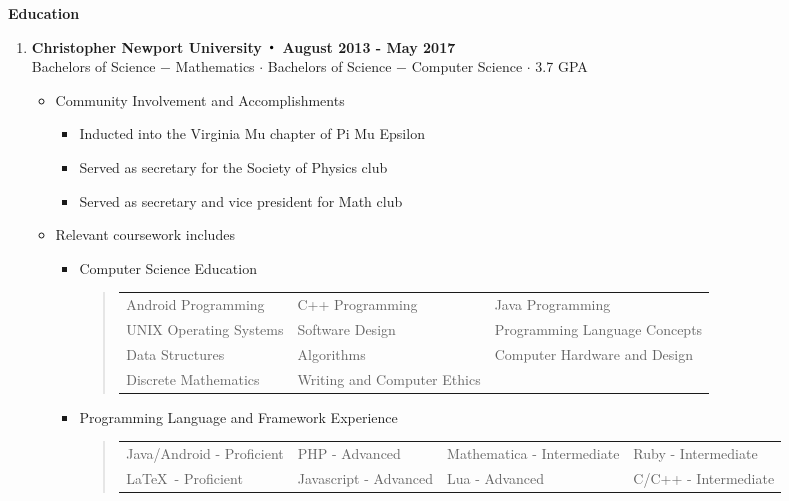 \noindent\textbf{\large Education}
\begin{enumerate}[label={\Roman*}.]
	\item \textbf{Christopher Newport University $\Bigcdot$ August 2013 - May 2017}\\
	      Bachelors of Science $-$ Mathematics $\cdot$ Bachelors of Science $-$ Computer Science $\cdot$ 3.7 GPA
	      \begin{itemize}
	      	\item Community Involvement and Accomplishments
	      	      \begin{itemize}
	      	      	\item Inducted into the Virginia Mu chapter of Pi Mu Epsilon
	      	      	\item Served as secretary for the Society of Physics club
	      	      	\item Served as secretary and vice president for Math club
	      	      \end{itemize}
	      	\item Relevant coursework includes
	      	      \begin{itemize}
	      	      	\item Computer Science Education
	      	      	      \begin{quote}
	      	      	      	\def\arraystretch{1.1}
	      	      	      	\begin{tabular}{l l l}
	      	      	      		Android Programming    & C++ Programming & Java Programming              \\
	      	      	      		UNIX Operating Systems & Software Design & Programming Language Concepts \\
	      	      	      		Data Structures        & Algorithms      & Computer Hardware and Design  \\
	      	      	      		Discrete Mathematics & Writing and Computer Ethics
	      	      	      	\end{tabular}
	      	      	      \end{quote}
	      	      	\item Programming Language and Framework Experience
	      	      	      \begin{quote}
	      	      	      	\def\arraystretch{1.1}
	      	      	      	\begin{tabular}{l l l l}
	      	      	      		Java/Android - Proficient & PHP - Advanced        & Mathematica - Intermediate & Ruby - Intermediate \\
	      	      	      		\LaTeX\ - Proficient       & Javascript - Advanced & Lua - Advanced & C/C++ - Intermediate

\end{tabular}
\end{quote}
\end{itemize}
\end{itemize}
\end{enumerate}
